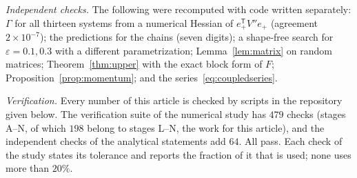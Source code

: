 \emph{Independent checks.} The following were recomputed with code written separately: $\Gamma$ for all thirteen systems from a numerical Hessian of $e_+^{\mathsf T}V''e_+$ (agreement $2\times10^{-7}$); the predictions for the chains (seven digits); a shape-free search for $\varepsilon = 0.1, 0.3$ with a different parametrization; Lemma~\ref{lem:matrix} on random matrices; Theorem~\ref{thm:upper} with the exact block form of $F$; Proposition~\ref{prop:momentum}; and the series~\eqref{eq:coupledseries}.

\emph{Verification.} Every number of this article is checked by scripts in the repository given below. The verification suite of the numerical study has $479$ checks (stages A--N, of which $198$ belong to stages L--N, the work for this article), and the independent checks of the analytical statements add $64$. All pass. Each check of the study states its tolerance and reports the fraction of it that is used; none uses more than $20\%$.
